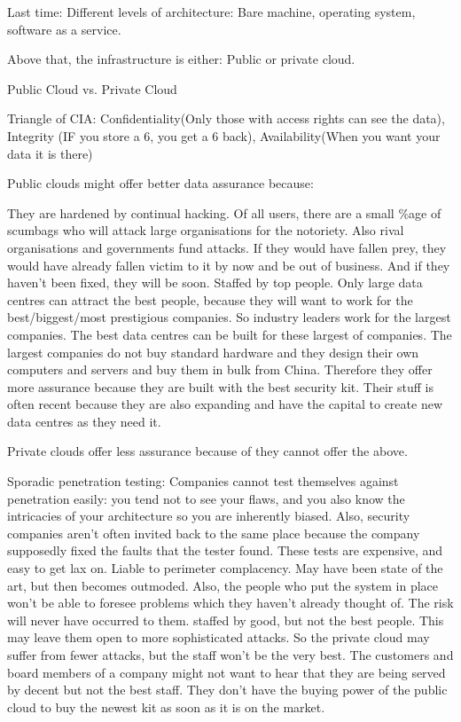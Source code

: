 \documentclass[11pt]{article}
\begin{document}
Last time: Different levels of architecture: Bare machine, operating system, software as a service.

Above that, the infrastructure is either: Public or private cloud.

Public Cloud vs. Private Cloud

Triangle of CIA: Confidentiality(Only those with access rights can see the data), Integrity (IF you store a 6, you get a 6 back), Availability(When you want your data it is there)

Public clouds might offer better data assurance because:

They are hardened by continual hacking. Of all users, there are a small \%age of scumbags who will attack large organisations for the notoriety. Also rival organisations and governments fund attacks. If they would have fallen prey, they would have already fallen victim to it by now and be out of business. And if they haven’t been fixed, they will be soon.
Staffed by top people. Only large data centres can attract the best people, because they will want to work for the best/biggest/most prestigious companies. So industry leaders work for the largest companies.
The best data centres can be built for these largest of companies. The largest companies do not buy standard hardware and they design their own computers and servers and buy them in bulk from China. Therefore they offer more assurance because they are built with the best security kit. Their stuff is often recent because they are also expanding and have the capital to create new data centres as they need it.

Private clouds offer less assurance because of they cannot offer the above.

Sporadic penetration testing: Companies cannot test themselves against penetration easily: you tend not to see your flaws, and you also know the intricacies of your architecture so you are inherently biased. Also, security companies aren’t often invited back to the same place because the company supposedly fixed the faults that the tester found. These tests are expensive, and easy to get lax on.
Liable to perimeter complacency. May have been state of the art, but then becomes outmoded. Also, the people who put the system in place won’t be able to foresee problems which they haven’t already thought of. The risk will never have occurred to them.
staffed by good, but not the best people. This may leave them open to more sophisticated attacks. So the private cloud may suffer from fewer attacks, but the staff won’t be the very best. The customers and board members of a company might not want to hear that they are being served by decent but not the best staff.
They don’t have the buying power of the public cloud to buy the newest kit as soon as it is on the market.
\end{document}
